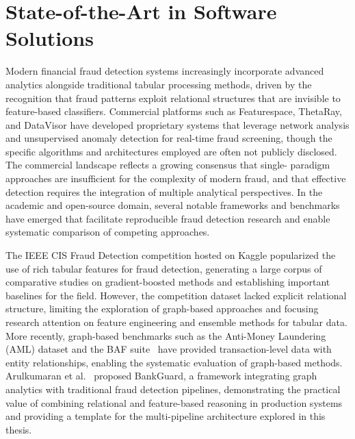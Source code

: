\section{State-of-the-Art in Software Solutions}

Modern financial fraud detection systems increasingly incorporate advanced
analytics alongside traditional tabular processing methods, driven by the
recognition that fraud patterns exploit relational structures that are invisible
to feature-based classifiers. Commercial platforms such as Featurespace,
ThetaRay, and DataVisor have developed proprietary systems that leverage network
analysis and unsupervised anomaly detection for real-time fraud screening,
though the specific algorithms and architectures employed are often not publicly
disclosed. The commercial landscape reflects a growing consensus that single-
paradigm approaches are insufficient for the complexity of modern fraud, and
that effective detection requires the integration of multiple analytical
perspectives. In the academic and open-source domain, several notable frameworks
and benchmarks have emerged that facilitate reproducible fraud detection
research and enable systematic comparison of competing approaches.

The IEEE CIS Fraud Detection competition hosted on Kaggle popularized the use of
rich tabular features for fraud detection, generating a large corpus of
comparative studies on gradient-boosted methods and establishing important
baselines for the field. However, the competition dataset lacked explicit
relational structure, limiting the exploration of graph-based approaches and
focusing research attention on feature engineering and ensemble methods for
tabular data. More recently, graph-based benchmarks such as the Anti-Money
Laundering (AML) dataset and the BAF suite~\cite{feedzai2022baf} have provided
transaction-level data with entity relationships, enabling the systematic
evaluation of graph-based methods. Arulkumaran et
al.~\cite{arulkumaran2022bankguard} proposed BankGuard, a framework integrating
graph analytics with traditional fraud detection pipelines, demonstrating the
practical value of combining relational and feature-based reasoning in
production systems and providing a template for the multi-pipeline architecture
explored in this thesis.

